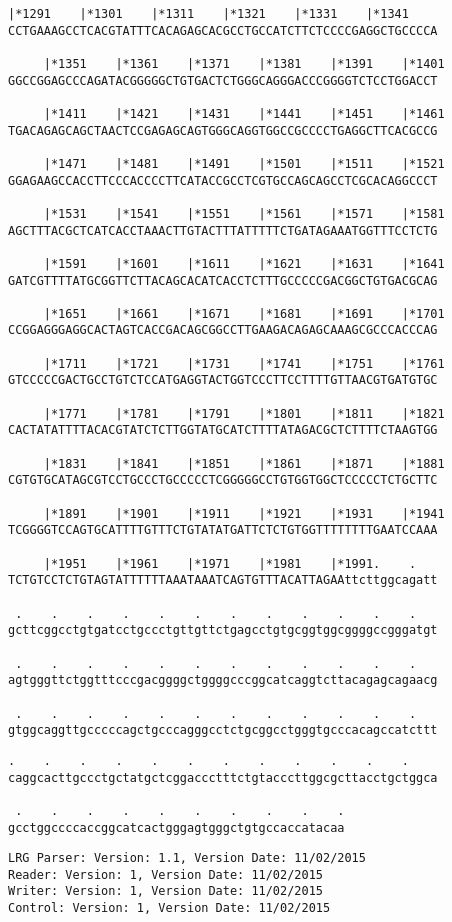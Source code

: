\documentclass{article}
\begin{document}
\begin{Verbatim}[fontfamily=courier]
     |*1291    |*1301    |*1311    |*1321    |*1331    |*1341
CCTGAAAGCCTCACGTATTTCACAGAGCACGCCTGCCATCTTCTCCCCGAGGCTGCCCCA

     |*1351    |*1361    |*1371    |*1381    |*1391    |*1401
GGCCGGAGCCCAGATACGGGGGCTGTGACTCTGGGCAGGGACCCGGGGTCTCCTGGACCT

     |*1411    |*1421    |*1431    |*1441    |*1451    |*1461
TGACAGAGCAGCTAACTCCGAGAGCAGTGGGCAGGTGGCCGCCCCTGAGGCTTCACGCCG

     |*1471    |*1481    |*1491    |*1501    |*1511    |*1521
GGAGAAGCCACCTTCCCACCCCTTCATACCGCCTCGTGCCAGCAGCCTCGCACAGGCCCT

     |*1531    |*1541    |*1551    |*1561    |*1571    |*1581
AGCTTTACGCTCATCACCTAAACTTGTACTTTATTTTTCTGATAGAAATGGTTTCCTCTG

     |*1591    |*1601    |*1611    |*1621    |*1631    |*1641
GATCGTTTTATGCGGTTCTTACAGCACATCACCTCTTTGCCCCCGACGGCTGTGACGCAG

     |*1651    |*1661    |*1671    |*1681    |*1691    |*1701
CCGGAGGGAGGCACTAGTCACCGACAGCGGCCTTGAAGACAGAGCAAAGCGCCCACCCAG

     |*1711    |*1721    |*1731    |*1741    |*1751    |*1761
GTCCCCCGACTGCCTGTCTCCATGAGGTACTGGTCCCTTCCTTTTGTTAACGTGATGTGC

     |*1771    |*1781    |*1791    |*1801    |*1811    |*1821
CACTATATTTTACACGTATCTCTTGGTATGCATCTTTTATAGACGCTCTTTTCTAAGTGG

     |*1831    |*1841    |*1851    |*1861    |*1871    |*1881
CGTGTGCATAGCGTCCTGCCCTGCCCCCTCGGGGGCCTGTGGTGGCTCCCCCTCTGCTTC

     |*1891    |*1901    |*1911    |*1921    |*1931    |*1941
TCGGGGTCCAGTGCATTTTGTTTCTGTATATGATTCTCTGTGGTTTTTTTTGAATCCAAA

     |*1951    |*1961    |*1971    |*1981    |*1991.    .   
TCTGTCCTCTGTAGTATTTTTTAAATAAATCAGTGTTTACATTAGAAttcttggcagatt

 .    .    .    .    .    .    .    .    .    .    .    .   
gcttcggcctgtgatcctgccctgttgttctgagcctgtgcggtggcggggccgggatgt

 .    .    .    .    .    .    .    .    .    .    .    .   
agtgggttctggtttcccgacggggctggggcccggcatcaggtcttacagagcagaacg

 .    .    .    .    .    .    .    .    .    .    .    .   
gtggcaggttgcccccagctgcccagggcctctgcggcctgggtgcccacagccatcttt

\end{Verbatim}
\newpage
\begin{Verbatim}[fontfamily=courier]
 .    .    .    .    .    .    .    .    .    .    .    .   
caggcacttgccctgctatgctcggaccctttctgtacccttggcgcttacctgctggca

 .    .    .    .    .    .    .    .    .    .
gcctggccccaccggcatcactgggagtgggctgtgccaccatacaa
\end{Verbatim}
\newpage
\begin{Verbatim}[fontfamily=courier]
LRG Parser: Version: 1.1, Version Date: 11/02/2015
Reader: Version: 1, Version Date: 11/02/2015
Writer: Version: 1, Version Date: 11/02/2015
Control: Version: 1, Version Date: 11/02/2015
\end{Verbatim}
\end{document}
